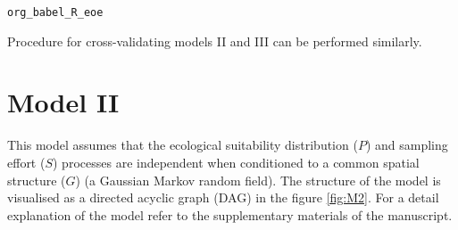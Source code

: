 \documentclass[11pt]{article}
\begin{document}
\begin{verbatim}
org_babel_R_eoe
\end{verbatim}


Procedure for cross-validating models II and III can be performed similarly.
\section{Model II}
\label{sec:org7a9efa2}
This model assumes that the ecological suitability distribution (\(P\)) and sampling effort (\(S\)) processes are independent when conditioned to a common spatial structure (\(G\)) (a Gaussian Markov random field). The structure of the model is visualised as a directed acyclic graph (DAG) in the figure \ref{fig:M2}.  For a detail explanation of the model refer to the supplementary materials of the manuscript.
\end{document}
